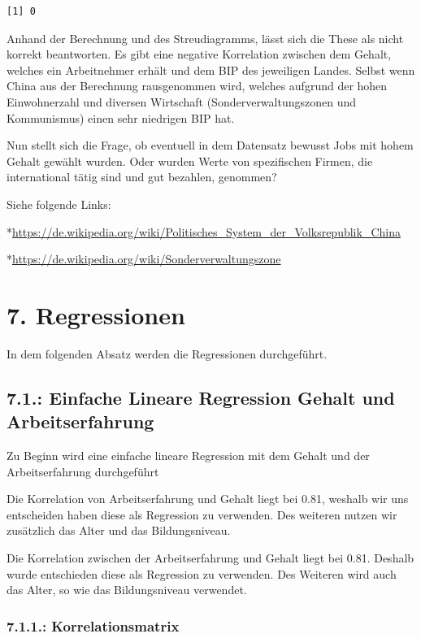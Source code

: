 \documentclass[
  letterpaper,
  DIV=11,
  numbers=noendperiod]{scrartcl}
\begin{document}
\begin{verbatim}
[1] 0
\end{verbatim}

Anhand der Berechnung und des Streudiagramms, lässt sich die These als
nicht korrekt beantworten. Es gibt eine negative Korrelation zwischen
dem Gehalt, welches ein Arbeitnehmer erhält und dem BIP des jeweiligen
Landes. Selbst wenn China aus der Berechnung rausgenommen wird, welches
aufgrund der hohen Einwohnerzahl und diversen Wirtschaft
(Sonderverwaltungszonen und Kommunismus) einen sehr niedrigen BIP hat.

Nun stellt sich die Frage, ob eventuell in dem Datensatz bewusst Jobs
mit hohem Gehalt gewählt wurden. Oder wurden Werte von spezifischen
Firmen, die international tätig sind und gut bezahlen, genommen?

Siehe folgende Links:

*\url{https://de.wikipedia.org/wiki/Politisches_System_der_Volksrepublik_China}

*\url{https://de.wikipedia.org/wiki/Sonderverwaltungszone}

\hypertarget{regressionen}{%
\section{7. Regressionen}\label{regressionen}}

In dem folgenden Absatz werden die Regressionen durchgeführt.

\hypertarget{einfache-lineare-regression-gehalt-und-arbeitserfahrung}{%
\subsection{7.1.: Einfache Lineare Regression Gehalt und
Arbeitserfahrung}\label{einfache-lineare-regression-gehalt-und-arbeitserfahrung}}

Zu Beginn wird eine einfache lineare Regression mit dem Gehalt und der
Arbeitserfahrung durchgeführt

Die Korrelation von Arbeitserfahrung und Gehalt liegt bei 0.81, weshalb
wir uns entscheiden haben diese als Regression zu verwenden. Des
weiteren nutzen wir zusätzlich das Alter und das Bildungsniveau.

Die Korrelation zwischen der Arbeitserfahrung und Gehalt liegt bei 0.81.
Deshalb wurde entschieden diese als Regression zu verwenden. Des
Weiteren wird auch das Alter, so wie das Bildungsniveau verwendet.

\hypertarget{korrelationsmatrix}{%
\subsubsection{7.1.1.: Korrelationsmatrix}\label{korrelationsmatrix}}
\end{document}
